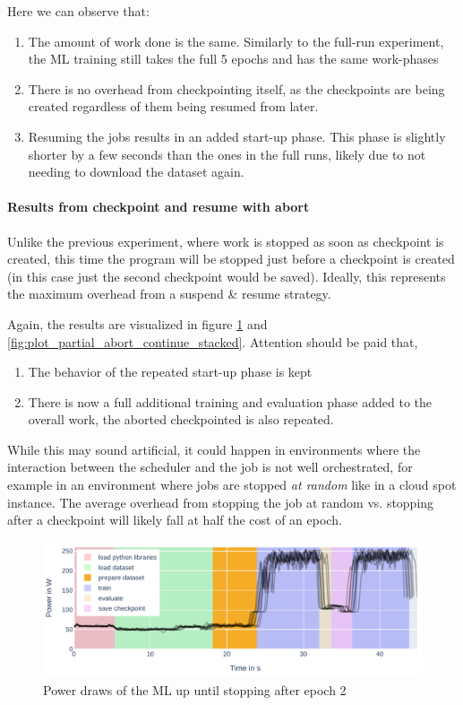 Here we can observe that:

\begin{enumerate}
    \item The amount of work done is the same. 
    Similarly to the full-run experiment, the ML training still takes the full 5 epochs and has the same work-phases
    \item There is no overhead from checkpointing itself, as the checkpoints are being created regardless of them being resumed from later.
    \item Resuming the jobs results in an added start-up phase. This phase is slightly shorter by a few seconds than the ones in the full runs, likely due to not needing to download the dataset again.
\end{enumerate}

\paragraph{Results from checkpoint and resume with abort}

Unlike the previous experiment, where work is stopped as soon as checkpoint is created, this time the program will be stopped just before a checkpoint is created (in this case just the second checkpoint would be saved). 
Ideally, this represents the maximum overhead from a suspend \& resume strategy. 

Again, the results are visualized in figure \ref{fig:plot_partial_abort_stacked} and \ref{fig:plot_partial_abort_continue_stacked}. 
Attention should be paid that,

\begin{enumerate}
    \item The behavior of the repeated start-up phase is kept
    \item There is now a full additional training and evaluation phase added to the overall work, the aborted checkpointed is also repeated.
\end{enumerate}

While this may sound artificial, it could happen in environments where the interaction between the scheduler and the job is not well orchestrated, for example in an environment where jobs are stopped \emph{at random} like in a cloud spot instance. 
The average overhead from stopping the job at random vs. stopping after a checkpoint will likely fall at half the cost of an epoch.

\begin{figure}
    \includegraphics[width=\linewidth]{power-measurements/stacked_plots/roberta_stop_without_saving.pdf}
    \caption{Power draws of the ML up until stopping after epoch 2}
    \label{fig:plot_partial_abort_stacked}
\end{figure}


